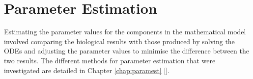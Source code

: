 
\section{Parameter Estimation}
Estimating the parameter values for the components in the mathematical model involved comparing the biological results with those produced by solving the ODEs and adjusting the parameter values to minimise the difference between the two results. The different methods for parameter estimation that were investigated are detailed in Chapter \ref{chap:paramest} [].